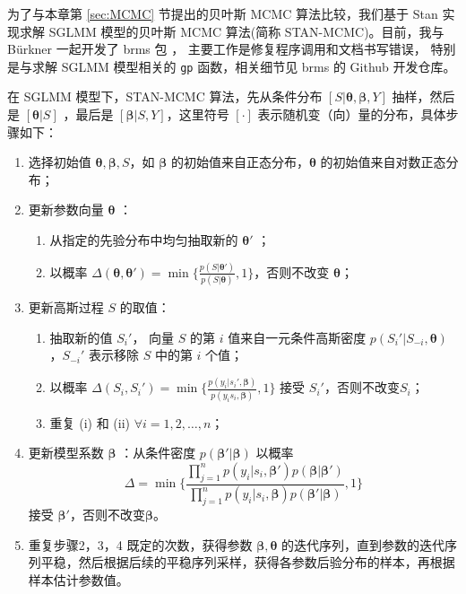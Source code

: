 \documentclass[12pt,a4paper,UTF8,twoside]{book}
\providecommand{\tightlist}{%
  \setlength{\itemsep}{0pt}\setlength{\parskip}{0pt}}
\theoremstyle{definition}
\theoremstyle{definition}
\theoremstyle{definition}
\theoremstyle{remark}
\begin{document}
为了与本章第 \ref{sec:MCMC} 节提出的贝叶斯 MCMC 算法比较，我们基于 Stan
实现求解 SGLMM 模型的贝叶斯 MCMC 算法(简称 STAN-MCMC)。目前，我与
Bürkner 一起开发了 brms 包 \citep{brms2017JSS}，
主要工作是修复程序调用和文档书写错误， 特别是与求解 SGLMM 模型相关的
\texttt{gp} 函数，相关细节见 brms 的 Github 开发仓库。

在 SGLMM 模型下，STAN-MCMC 算法，先从条件分布
\([S|\boldsymbol{\theta},\boldsymbol{\beta},Y]\) 抽样，然后是
\([\boldsymbol{\theta}|S]\) ，最后是
\([\boldsymbol{\beta}|S,Y]\)，这里符号 \([\cdot]\)
表示随机变（向）量的分布，具体步骤如下：

\begin{enumerate}
\def\labelenumi{\arabic{enumi}.}
\tightlist
\item
  选择初始值 \(\boldsymbol{\theta},\boldsymbol{\beta},S\)，如
  \(\boldsymbol{\beta}\) 的初始值来自正态分布，\(\boldsymbol{\theta}\)
  的初始值来自对数正态分布；
\item
  更新参数向量 \(\boldsymbol{\theta}\) ：

  \begin{enumerate}
  \def\labelenumii{(\roman{enumii})}
  \tightlist
  \item
    从指定的先验分布中均匀抽取新的 \(\boldsymbol{\theta}'\) ；
  \item
    以概率
    \(\Delta(\boldsymbol{\theta},\boldsymbol{\theta}') = \min \big\{\frac{p(S|\boldsymbol{\theta}')}{p(S|\boldsymbol{\theta})},1\big\}\)，否则不改变
    \(\boldsymbol{\theta}\)；
  \end{enumerate}
\item
  更新高斯过程 \(S\) 的取值：

  \begin{enumerate}
  \def\labelenumii{(\roman{enumii})}
  \tightlist
  \item
    抽取新的值 \(S_{i}'\)， 向量 \(S\) 的第 \(i\) 值来自一元条件高斯密度
    \(p(S_{i}'|S_{-i},\boldsymbol{\theta})\)，\(S_{-i}'\) 表示移除 \(S\)
    中的第 \(i\) 个值；
  \item
    以概率
    \(\Delta(S_{i},S_{i}') = \min\big\{ \frac{p(y_{i}|s_{i}',\boldsymbol{\beta})}{p(y_{i}s_{i},\boldsymbol{\beta})},1 \big\}\)
    接受 \(S_{i}'\)，否则不改变\(S_i\)；
  \item
    重复 (i) 和 (ii) \(\forall i = 1,2,\ldots,n\)；
  \end{enumerate}
\item
  更新模型系数 \(\boldsymbol{\beta}\) ：从条件密度
  \(p(\boldsymbol{\beta}'|\boldsymbol{\beta})\) 以概率
  \[\Delta = \min \big\{ \frac{\prod_{j=1}^{n}p(y_i|s_{i},\boldsymbol{\beta}')p(\boldsymbol{\beta}|\boldsymbol{\beta}')}{\prod_{j=1}^{n}p(y_i|s_{i},\boldsymbol{\beta})p(\boldsymbol{\beta}'|\boldsymbol{\beta})},1  \big\}\]
  接受 \(\boldsymbol{\beta}'\)，否则不改变\(\boldsymbol{\beta}\)。
\item
  重复步骤2，3，4 既定的次数，获得参数
  \(\boldsymbol{\beta},\boldsymbol{\theta}\)
  的迭代序列，直到参数的迭代序列平稳，然后根据后续的平稳序列采样，获得各参数后验分布的样本，再根据样本估计参数值。
\end{enumerate}
\end{document}
